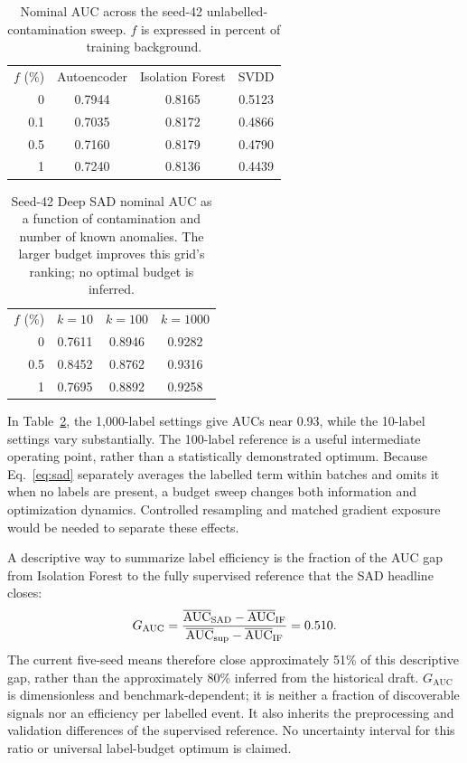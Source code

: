 \documentclass[reprint,aps,pra,amsmath,amssymb,floatfix,raggedbottom]{revtex4-2}
\newcommand{\AUC}{\mathrm{AUC}}
\begin{document}
\begin{table}[tbp]
\caption{Nominal AUC across the seed-42 unlabelled-contamination sweep. $f$ is expressed in percent of training background.}\label{tab:contamination}
\begin{ruledtabular}\begin{tabular}{rccc}
$f$ (\%) & Autoencoder & Isolation Forest & SVDD\\
0 & 0.7944 & 0.8165 & 0.5123\\
0.1 & 0.7035 & 0.8172 & 0.4866\\
0.5 & 0.7160 & 0.8179 & 0.4790\\
1 & 0.7240 & 0.8136 & 0.4439\\
\end{tabular}\end{ruledtabular}
\end{table}

\begin{table}[tbp]
\caption{Seed-42 Deep SAD nominal AUC as a function of contamination and number of known anomalies. The larger budget improves this grid's ranking; no optimal budget is inferred.}\label{tab:sadgrid}
\begin{ruledtabular}\begin{tabular}{rccc}
$f$ (\%) & $k=10$ & $k=100$ & $k=1000$\\
0 & 0.7611 & 0.8946 & 0.9282\\
0.5 & 0.8452 & 0.8762 & 0.9316\\
1 & 0.7695 & 0.8892 & 0.9258\\
\end{tabular}\end{ruledtabular}
\end{table}

In Table~\ref{tab:sadgrid}, the 1,000-label settings give AUCs near 0.93, while the 10-label settings vary substantially. The 100-label reference is a useful intermediate operating point, rather than a statistically demonstrated optimum. Because Eq.~\eqref{eq:sad} separately averages the labelled term within batches and omits it when no labels are present, a budget sweep changes both information and optimization dynamics. Controlled resampling and matched gradient exposure would be needed to separate these effects.

A descriptive way to summarize label efficiency is the fraction of the AUC gap from Isolation Forest to the fully supervised reference that the SAD headline closes:
\begin{equation}\label{eq:gapfraction}
 G_{\AUC}={\overline{\AUC}_{\mathrm{SAD}}-\overline{\AUC}_{\mathrm{IF}}\over
 \overline{\AUC}_{\mathrm{sup}}-\overline{\AUC}_{\mathrm{IF}}}=0.510.
\end{equation}
The current five-seed means therefore close approximately 51\% of this descriptive gap, rather than the approximately 80\% inferred from the historical draft. $G_{\AUC}$ is dimensionless and benchmark-dependent; it is neither a fraction of discoverable signals nor an efficiency per labelled event. It also inherits the preprocessing and validation differences of the supervised reference. No uncertainty interval for this ratio or universal label-budget optimum is claimed.
\end{document}
